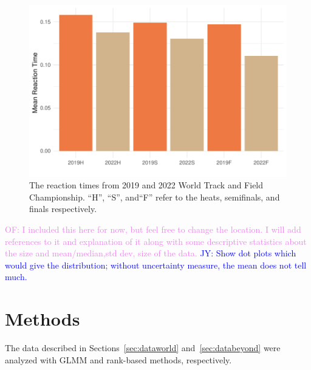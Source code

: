 \documentclass[12pt, letterpaper, titlepage]{article}
\newcommand{\jy}[1]{\textcolor{blue}{JY: #1}}
\newcommand{\of}[1]{\textcolor{violet}{OF: #1}}
\begin{document}
\begin{figure}[tbp]
  \centering
  \includegraphics{2019vs2022BarGraph}
  \caption{The reaction times from 2019 and 2022 World Track and Field
  Championship. ``H'', ``S'', and``F'' refer to the heats, semifinals, and finals
  respectively.}
  \label{fig:2019vs2022Graph}
\end{figure}
\of{I included this here for now, but feel free to change the location.  I will
add references to it and explanation of it along with some descriptive statistics about
the size and mean/median,std dev, size of the data.}
\jy{Show dot plots which would give the distribution; without uncertainty
  measure, the mean does not tell much.}


\section{Methods} \label{sec:Methods}

The data described in Sections~\ref{sec:dataworld} and~\ref{sec:databeyond} were
analyzed with GLMM and rank-based methods, respectively.
\end{document}
